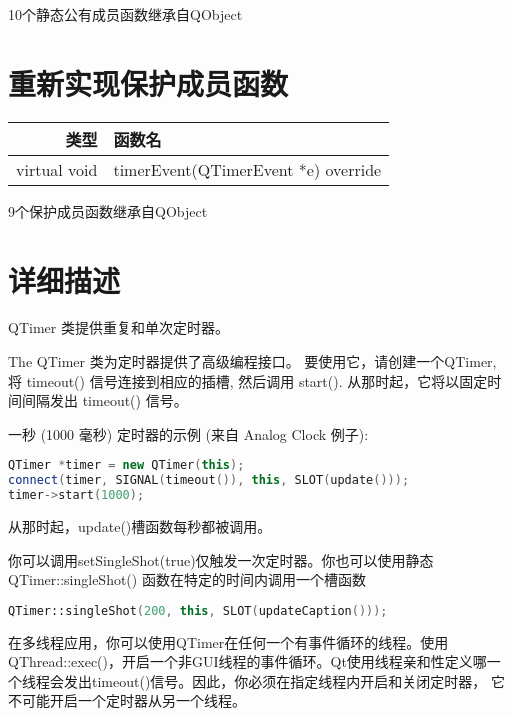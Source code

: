 \begin{compactitem}
\item 10个静态公有成员函数继承自QObject
\end{compactitem}

\section{重新实现保护成员函数}


\begin{tabular}{|r|l|}
	\hline
	类型	 & 函数名 \\
	\hline
virtual void	& timerEvent(QTimerEvent *e) override \\ 
\hline
\end{tabular}


\begin{compactitem}
\item 9个保护成员函数继承自QObject
\end{compactitem}

\section{详细描述}

QTimer 类提供重复和单次定时器。

The QTimer 类为定时器提供了高级编程接口。 要使用它，请创建一个QTimer, 将 timeout() 信号连接到相应的插槽, 然后调用 start(). 从那时起，它将以固定时间间隔发出 timeout() 信号。

一秒 (1000 毫秒) 定时器的示例 (来自 Analog Clock 例子):

\begin{lstlisting}[language=C++]
QTimer *timer = new QTimer(this);
connect(timer, SIGNAL(timeout()), this, SLOT(update()));
timer->start(1000);
\end{lstlisting}


从那时起，update()槽函数每秒都被调用。

你可以调用setSingleShot(true)仅触发一次定时器。你也可以使用静态QTimer::singleShot() 函数在特定的时间内调用一个槽函数

\begin{lstlisting}[language=C++]
QTimer::singleShot(200, this, SLOT(updateCaption()));
\end{lstlisting}

在多线程应用，你可以使用QTimer在任何一个有事件循环的线程。使用QThread::exec()，开启一个非GUI线程的事件循环。Qt使用线程亲和性定义哪一个线程会发出timeout()信号。因此，你必须在指定线程内开启和关闭定时器， 它不可能开启一个定时器从另一个线程。

